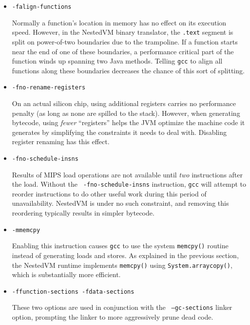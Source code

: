 \documentclass{acmconf}
\begin{document}
\begin{itemize}

\item {\tt -falign-functions}

      Normally a function's location in memory has no effect on its
      execution speed.  However, in the NestedVM binary translator,
      the {\tt .text} segment is split on power-of-two boundaries due
      to the trampoline.  If a function starts near the end of one of
      these boundaries, a performance critical part of the function
      winds up spanning two Java methods.  Telling {\tt gcc} to align
      all functions along these boundaries decreases the chance of
      this sort of splitting.

\item {\tt -fno-rename-registers}

      On an actual silicon chip, using additional registers carries no
      performance penalty (as long as none are spilled to the stack).
      However, when generating bytecode, using {\it fewer}
      ``registers'' helps the JVM optimize the machine code it
      generates by simplifying the constraints it needs to deal with.
      Disabling register renaming has this effect.

\item {\tt -fno-schedule-insns}

      Results of MIPS load operations are not available until {\it
      two} instructions after the load.  Without the {\tt
      -fno-schedule-insns} instruction, {\tt gcc} will attempt to
      reorder instructions to do other useful work during this period
      of unavailability.  NestedVM is under no such constraint, and
      removing this reordering typically results in simpler bytecode.

\item {\tt -mmemcpy}

      Enabling this instruction causes {\tt gcc} to use the system
      {\tt memcpy()} routine instead of generating loads and stores.
      As explained in the previous section, the NestedVM runtime
      implements {\tt memcpy()} using {\tt System.arraycopy()}, which
      is substantially more efficient.

\item {\tt -ffunction-sections -fdata-sections}

      These two options are used in conjunction with the {\tt
      --gc-sections} linker option, prompting the linker to more
      aggressively prune dead code.

\end{itemize}
\end{document}
